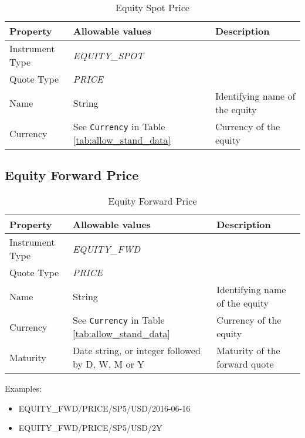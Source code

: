 \begin{table}[H]
    \centering
    \begin{tabular}{|p{3cm}|p{3.5cm}|p{7cm}|}
        \hline
        {\bf Property} & {\bf Allowable values} & {\bf Description} \\ \hline
        Instrument Type & \emph{EQUITY\_SPOT} & \\ \hline
        Quote Type & \emph{PRICE} & \\ \hline
        Name & String & Identifying name of the equity \\ \hline
        Currency & See \lstinline!Currency! in Table \ref{tab:allow_stand_data}&  Currency of the equity \\ \hline
    \end{tabular}
    \caption{Equity Spot Price}
    \label{tab:eqspot_quote}
\end{table}

\subsection{Equity Forward Price}

\begin{table}[H]
    \centering
    \begin{tabular}{|p{3cm}|p{3.5cm}|p{7cm}|}
        \hline
        {\bf Property} & {\bf Allowable values} & {\bf Description} \\ \hline
        Instrument Type & \emph{EQUITY\_FWD} & \\ \hline
        Quote Type & \emph{PRICE} & \\ \hline
        Name & String & Identifying name of the equity \\ \hline
        Currency & See \lstinline!Currency! in Table \ref{tab:allow_stand_data}&  Currency of the equity \\ \hline
        Maturity & Date string, or integer followed by D, W, M or Y & Maturity of the forward quote \\ \hline
    \end{tabular}
    \caption{Equity Forward Price}
    \label{tab:eqfwd_quote}
\end{table}

\medskip
Examples:
\begin{itemize}
    \item {EQUITY\_FWD/PRICE/SP5/USD/2016-06-16}
    \item {EQUITY\_FWD/PRICE/SP5/USD/2Y}
\end{itemize}

